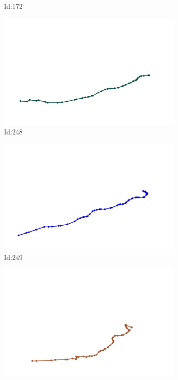 \documentclass[12pt,twoside]{report}
\begin{document}
\begin{figure}
\begin{subfigure}[b]{0.20\textwidth}
\caption{Id:172}
\end{subfigure}
\begin{subfigure}[b]{0.20\textwidth}
\centering
\includegraphics[width=\textwidth]{../trajectories/248.png}
\caption{Id:248}
\end{subfigure}
\begin{subfigure}[b]{0.20\textwidth}
\centering
\includegraphics[width=\textwidth]{../trajectories/249.png}
\caption{Id:249}
\end{subfigure}
\begin{subfigure}[b]{0.20\textwidth}
\centering
\includegraphics[width=\textwidth]{../trajectories/261.png}

\end{subfigure}
\end{figure}
\end{document}
